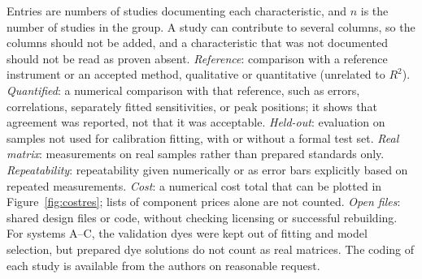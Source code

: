 \vspace{-6pt}
\noindent\begin{minipage}{\textwidth}\footnotesize\raggedright
Entries are numbers of studies documenting each characteristic, and $n$ is the number of studies in the group. A study can contribute to several columns, so the columns should not be added, and a characteristic that was not documented should not be read as proven absent.
\textit{Reference}: comparison with a reference instrument or an accepted method, qualitative or quantitative (unrelated to $R^2$).
\textit{Quantified}: a numerical comparison with that reference, such as errors, correlations, separately fitted sensitivities, or peak positions; it shows that agreement was reported, not that it was acceptable.
\textit{Held-out}: evaluation on samples not used for calibration fitting, with or without a formal test set.
\textit{Real matrix}: measurements on real samples rather than prepared standards only.
\textit{Repeatability}: repeatability given numerically or as error bars explicitly based on repeated measurements.
\textit{Cost}: a numerical cost total that can be plotted in Figure~\ref{fig:costres}; lists of component prices alone are not counted.
\textit{Open files}: shared design files or code, without checking licensing or successful rebuilding.
For systems A--C, the validation dyes were kept out of fitting and model selection, but prepared dye solutions do not count as real matrices. The coding of each study is available from the authors on reasonable request.
\end{minipage}
\endgroup
\FloatBarrier
